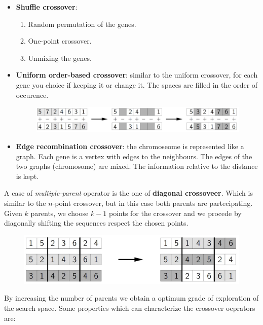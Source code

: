 \documentclass{article}
\begin{document}
\begin{itemize}
    \item \textbf{Shuffle crossover}:
    \begin{enumerate}
        \item Random permutation of the genes.
        \item One-point crossover.
        \item Unmixing the genes.
    \end{enumerate}
    \item \textbf{Uniform order-based crossover}: similar to the uniform crossover,
    for each gene you choice if keeping it or change it. The spaces are filled
    in the order of occurence.
    \begin{figure}[H]
        \centering
        \includegraphics[scale=0.5]{images/uacrossover.png}
    \end{figure}
    \item \textbf{Edge recombination crossover}: the chromoseome is represented like
    a graph. Each gene is a vertex with edges to the neighbours. The edges of the
    two graphs (chromosome) are mixed. The information relative to the
    distance is kept.
\end{itemize}
A case of \textit{multiple-parent} operator is the one of \textbf{diagonal crossoveer}.
Which is similar to the $n$-point crossover, but in this case both parents are
partecipating. Given $k$ parents, we choose $k-1$ points for the crossover and we
procede by diagonally shifting the sequences respect the chosen points.
\begin{figure}[H]
    \centering
    \includegraphics[scale=0.5]{images/dcrossover.png}
\end{figure}
By increasing the number of parents we obtain a optimum grade of exploration of the
search space. Some properties which can characterize the crossover oeprators are:
\end{document}
